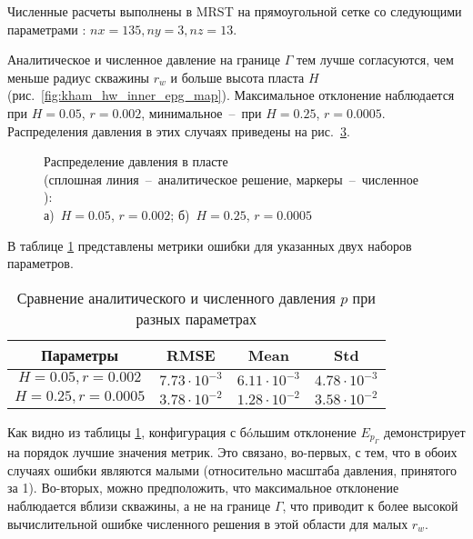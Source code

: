 \documentclass{article}
\begin{document}
Численные расчеты выполнены в MRST на прямоугольной сетке со следующими параметрами : $nx=  135, ny = 3, nz = 13$.

Аналитическое и численное давление на границе $\Gamma$ тем лучше согласуются, чем меньше радиус скважины $r_w$ и больше высота пласта $H$ (рис.~\ref{fig:kham_hw_inner_epg_map}). Максимальное отклонение наблюдается при $H = 0.05$, $r = 0.002$, минимальное~--~при $H = 0.25$, $r = 0.0005$. Распределения давления в этих случаях приведены на рис.~\ref{fig:kham_hw_inner_press_disrt}.

\begin{figure}[!ht]
\centering
\begin{subfigure}{0.48\textwidth}
\centering

\caption{}
\label{fig:kham_hw_inner_p_worst_pg}
\end{subfigure}
\hfill
\begin{subfigure}{0.48\textwidth}
\centering

\caption{}
\label{fig:kham_hw_inner_p_best_pg}
\end{subfigure}
\caption{
Распределение давления в пласте \\ (сплошная линия~--~аналитическое решение, маркеры~--~численное ): \\
а)~$H = 0.05$, $r = 0.002$;
б)~$H = 0.25$, $r = 0.0005$
}
\label{fig:kham_hw_inner_press_disrt}
\end{figure}

В таблице \ref{tab:kham_hw_inner_p_error_metrics} представлены метрики ошибки для указанных двух наборов параметров.

\begin{table}[h!]
\centering
\caption{Сравнение аналитического и численного давления $p$ при разных параметрах}
\label{tab:kham_hw_inner_p_error_metrics}
\begin{tabular}{|c|c|c|c|}
\hline
\textbf{Параметры} & \textbf{RMSE} & \textbf{Mean} & \textbf{Std} \\
\hline
$H=0.05, r=0.002$ & $7.73 \cdot 10^{-3}$ & $6.11 \cdot 10^{-3}$ & $4.78 \cdot 10^{-3}$ \\
\hline
$H=0.25, r=0.0005$ & $3.78 \cdot 10^{-2}$ & $1.28 \cdot 10^{-2}$ & $3.58 \cdot 10^{-2}$ \\
\hline
\end{tabular}
\end{table}

Как видно из таблицы \ref{tab:kham_hw_inner_p_error_metrics}, конфигурация  с б\'{o}льшим отклонение $E_{p_{\Gamma}}$ демонстрирует на порядок лучшие значения метрик. Это связано, во-первых, с тем, что в обоих случаях ошибки являются малыми (относительно масштаба давления, принятого за 1). Во-вторых, можно предположить, что максимальное отклонение наблюдается вблизи скважины, а не на границе $\Gamma$, что приводит к более высокой вычислительной ошибке численного решения в этой области для малых $r_w$.
\end{document}
